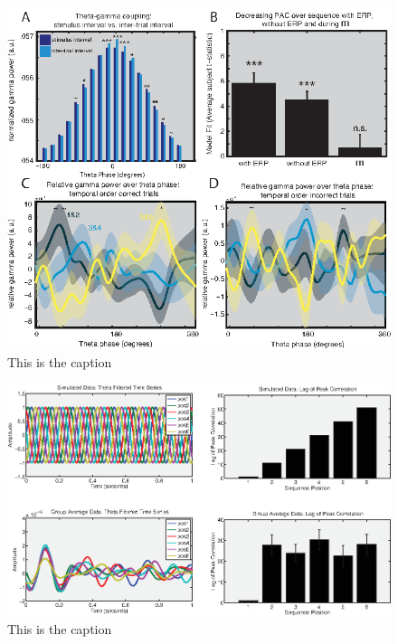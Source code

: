 \begin{figure}[htbp]
\centering
\includegraphics{figures/chapter3_suppfigure11}
\caption{This is the caption}
\end{figure}

\begin{figure}[htbp]
\centering
\includegraphics{figures/chapter3_suppfigure12}
\caption{This is the caption}
\end{figure}

